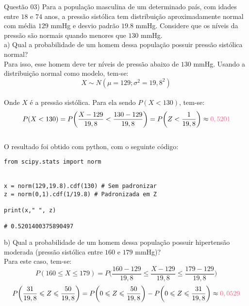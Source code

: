 
\noindent \textcolor{COLOR1}{Questão 03)} Para a população masculina de um determinado país, com idades entre $18$ e $74$ anos, a pressão sistólica tem distribuição aproximadamente normal com média $129$ mmHg e desvio padrão $19.8$ mmHg. Considere que os níveis da pressão são normais quando menores que $130$ mmHg.
\\

a) Qual a probabilidade de um homem dessa população possuir pressão sistólica normal?\\

Para isso, esse homem deve ter níveis de pressão abaixo de $130$ mmHg. Usando a distribuição normal como modelo, tem-se:
\\

\[
    X \sim N(\mu = 129; \sigma^2=19,8^2)
\]
\\

Onde $X$ é a pressão sistólica. Para ela sendo $P(X<130)$, tem-se:
\\

\[
    P(X<130)=P\biggl(\frac{X-129}{19,8}<\frac{130-129}{19,8}\biggr) = P\biggl(Z<\frac{1}{19,8}\biggr)\approx \textcolor{COLOR2}{0,5201}
\]
\\

O resultado foi obtido com python, com o seguinte código:\\

\begin{lstlisting}
from scipy.stats import norm


x = norm(129,19.8).cdf(130) # Sem padronizar
z = norm(0,1).cdf(1/19.8) # Padronizada em Z
    
print(x," ", z)
    
# 0.5201400375890497
\end{lstlisting}

b)  Qual a probabilidade de um homem dessa população possuir hipertensão moderada (pressão sistólica entre $160$ e $179$ mmHg)?\\

Para este caso, tem-se:
\\

\[
    P(160\leqslant X\leqslant 179)=P\biggl(\frac{160-129}{19,8}\leqslant\frac{X-129}{19,8}\leqslant\frac{179-129}{19,8}\biggr)
\]
\[
    P\biggl(\frac{31}{19,8}\leqslant Z\leqslant\frac{50}{19,8}\biggr) = P\biggl(0\leqslant Z \leqslant \frac{50}{19,8}\biggr)-P\biggl(0\leqslant Z \leqslant \frac{31}{19,8}\biggr) \approx \textcolor{COLOR2}{0,0529}
\]
\\

